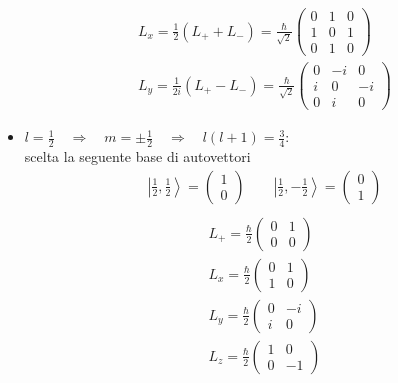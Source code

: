 \begin{itemize}
\begin{equation}
\begin{split}
L_x=\frac{1}{2}\left(L_++L_-\right)=\frac{\hbar }{\sqrt{2}} \left(\begin{matrix}0&1&0\\1&0&1\\0&1&0\end{matrix}\right) \\
L_y=\frac{1}{2i}\left(L_+-L_-\right)=\frac{\hbar }{\sqrt{2}}\left(\begin{matrix}0&-i&0\\i&0&-i\\0&i&0\end{matrix}\right)
\end{split}\end{equation}
\item $l=\frac{1}{2} \quad\Longrightarrow\quad m=\pm\frac{1}{2} \quad\Longrightarrow\quad l\left(l+1\right)=\frac{3}{4}$:\\
scelta la seguente base di autovettori
\begin{equation}\begin{split}
\left |\frac{1}{2},\frac{1}{2} \right\rangle=\left(\begin{matrix}1\\0\end{matrix}\right) \qquad
\left |\frac{1}{2}, -\frac{1}{2} \right\rangle=\left(\begin{matrix}0\\1\end{matrix}\right) \\
\end{split}\end{equation}
\begin{equation}\begin{split}
L_+=\frac{\hbar}{2}\left(\begin{matrix}0&1\\0&0\end{matrix}\right) \\
L_x=\frac{\hbar }{2}\left(\begin{matrix}0&1\\1&0\end{matrix}\right) \\
L_y=\frac{\hbar }{2}\left(\begin{matrix}0&-i\\i&0\end{matrix}\right) \\
L_z=\frac{\hbar }{2}\left(\begin{matrix}1&0\\0&-1\end{matrix}\right) \\

\end{split}
\end{equation}
\end{itemize}
